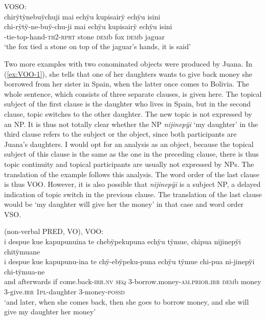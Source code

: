 \ea\label{ex:VOSO}
\begingl
\glpreamble \textup{VOSO:}\\chirÿtÿnebuÿchuji mai echÿu kupisairÿ echÿu isini\\
\gla chi-rÿtÿ-ne-buÿ-chu-ji mai echÿu kupisairÿ echÿu isini\\
-tie-top-hand-\textsc{th}2-\textsc{rprt} stone \textsc{dem}b fox \textsc{dem}b jaguar\\
\glft ‘the fox tied a stone on top of the jaguar’s hands, it is said’
\endgl
\trailingcitation{[rxx-n120511l-1.037]}
\xe
 
Two more examples with two conominated objects were produced by Juana. In (\ref{ex:VOO-1}), she tells that one of her daughters wants to give back money she borrowed from her sister in Spain, when the latter once comes to Bolivia. The whole sentence, which consists of three separate clauses, is given here. The topical subject of the first clause is the daughter who lives in Spain, but in the second clause, topic switches to the other daughter. The new topic is not expressed by an NP. It is thus not totally clear whether the NP \textit{nijinepÿi} ‘my daughter’ in the third clause refers to the subject or the object, since both participants are Juana’s daughters. I would opt for an analysis as an object, because the topical subject of this clause is the same as the one in the preceding clause, there is thus topic continuity and topical participants are usually not expressed by NPs. The translation of the example follows this analysis. The word order of the last clause is thus VOO. However, it is also possible that \textit{nijinepÿi} is a subject NP, a delayed indication of topic switch in the previous clause. The translation of the last clause would be ‘my daughter will give her the money’ in that case and word order VSO.

\ea\label{ex:VOO-1}
\begingl
\glpreamble \textup{(non-verbal PRED, VO), VOO:}\\i despue kue kapupunuina te chebÿpekupuna echÿu tÿmue, chipua nijinepÿi \\chitÿmuane\\
\gla i despue kue kapupunu-ina te chÿ-ebÿpeku-puna echÿu tÿmue chi-pua ni-jinepÿi chi-tÿmua-ne\\
\glb and afterwards if come.back-\textsc{irr.nv} \textsc{seq} 3-borrow.money-\textsc{am.prior.irr} \textsc{dem}b money 3-give.\textsc{irr} 1\textsc{pl}-daughter 3-money-\textsc{possd}\\
\glft ‘and later, when she comes back, then she goes to borrow money, and she will give my daughter her money’
\endgl
\trailingcitation{[jxx-p120430l-1.294]}
\xe

